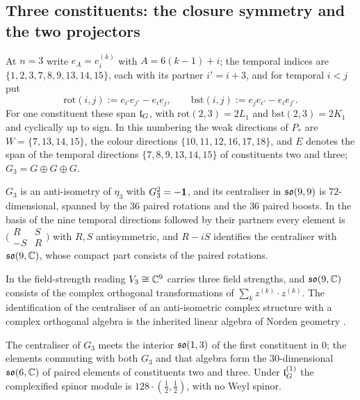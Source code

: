 \subsection{Three constituents: the closure symmetry and the two projectors}
\label{sec:closurethree}

At $n=3$ write $e_A=e^{(k)}_i$ with $A=6(k-1)+i$; the temporal indices are $\{1,2,3,7,8,9,13,14,15\}$, each with its partner $i'=i+3$, and for
temporal $i<j$ put
\[
\mathrm{rot}(i,j):=e_{i'}e_{j'}-e_ie_j,\qquad \mathrm{bst}(i,j):=e_je_{i'}-e_ie_{j'} .
\]
For one constituent these span $\mathfrak l_G$, with $\mathrm{rot}(2,3)=2L_1$ and $\mathrm{bst}(2,3)=2K_1$ and cyclically up to sign. In this numbering the
weak directions of $P_*$ are $W=\{7,13,14,15\}$, the colour directions $\{10,11,12,16,17,18\}$, and $E$ denotes the span of the temporal directions
$\{7,8,9,13,14,15\}$ of constituents two and three; $G_3=G\oplus G\oplus G$.

\begin{theorem}
\label{thm:so9C}
$G_3$ is an anti-isometry of $\eta_3$ with $G_3^2=-\mathbf 1$, and its centraliser in $\mathfrak{so}(9,9)$ is $72$-dimensional, spanned by the $36$ paired rotations
and the $36$ paired boosts. In the basis of the nine temporal directions followed by their partners every element is
$\bigl(\begin{smallmatrix}R&S\\-S&R\end{smallmatrix}\bigr)$ with $R,S$ antisymmetric, and $R-iS$ identifies the centraliser with $\mathfrak{so}(9,\mathbb{C})$, whose
compact part consists of the paired rotations.
\end{theorem}

In the field-strength reading $V_3\cong\mathbb{C}^9$ carries three field strengths, and $\mathfrak{so}(9,\mathbb{C})$ consists of the complex orthogonal transformations of
$\sum_kz^{(k)}\cdot z^{(k)}$. The identification of the centraliser of an anti-isometric complex structure with a complex orthogonal algebra is
the inherited linear algebra of Norden geometry \cite{BorowiecFrancavigliaVolovich00}.

\begin{theorem}
\label{thm:nocommon}
The centraliser of $G_3$ meets the interior $\mathfrak{so}(1,3)$ of the first constituent in $0$; the elements commuting with both $G_3$ and that algebra form
the $30$-dimensional $\mathfrak{so}(6,\mathbb{C})$ of paired elements of constituents two and three. Under $\mathfrak l_G^{(1)}$ the complexified spinor module is
$128\cdot(\tfrac12,\tfrac12)$, with no Weyl spinor.
\end{theorem}


